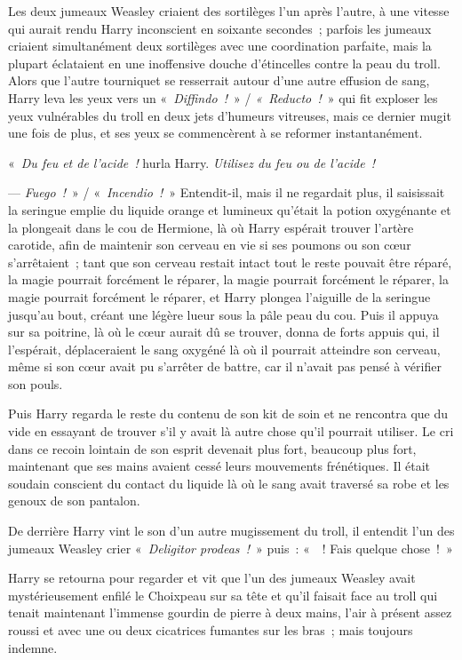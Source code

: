 Les deux jumeaux Weasley criaient des sortilèges l'un après l'autre, à une vitesse qui aurait rendu Harry inconscient en soixante secondes~; parfois les jumeaux criaient simultanément deux sortilèges avec une coordination parfaite, mais la plupart éclataient en une inoffensive douche d'étincelles contre la peau du troll.
Alors que l'autre tourniquet se resserrait autour d'une autre effusion de sang, Harry leva les yeux vers un «~\emph{Diffindo~!}~» / \emph{«~Reducto~!}~» qui fit exploser les yeux vulnérables du troll en deux jets d'humeurs vitreuses, mais ce dernier mugit une fois de plus, et ses yeux se commencèrent à se reformer instantanément.

«~\emph{Du feu et de l'acide~!} hurla Harry.
\emph{Utilisez du feu ou de l'acide~!}

--- \emph{Fuego~!}~» / «~\emph{Incendio~!}~» Entendit-il, mais il ne regardait plus, il saisissait la seringue emplie du liquide orange et lumineux qu'était la potion oxygénante et la plongeait dans le cou de Hermione, là où Harry espérait trouver l'artère carotide, afin de maintenir son cerveau en vie si ses poumons ou son cœur s'arrêtaient~; tant que son cerveau restait intact tout le reste pouvait être réparé, la magie pourrait forcément le réparer, la magie pourrait forcément le réparer, la magie pourrait forcément le réparer, et Harry plongea l'aiguille de la seringue jusqu'au bout, créant une légère lueur sous la pâle peau du cou.
Puis il appuya sur sa poitrine, là où le cœur aurait dû se trouver, donna de forts appuis qui, il l'espérait, déplaceraient le sang oxygéné là où il pourrait atteindre son cerveau, même si son cœur avait pu s'arrêter de battre, car il n'avait pas pensé à vérifier son pouls.

Puis Harry regarda le reste du contenu de son kit de soin et ne rencontra que du vide en essayant de trouver s'il y avait là autre chose qu'il pourrait utiliser.
Le cri dans ce recoin lointain de son esprit devenait plus fort, beaucoup plus fort, maintenant que ses mains avaient cessé leurs mouvements frénétiques.
Il était soudain conscient du contact du liquide là où le sang avait traversé sa robe et les genoux de son pantalon.

De derrière Harry vint le son d'un autre mugissement du troll, il entendit l'un des jumeaux Weasley crier «~\emph{Deligitor prodeas~!}~» puis~: «~~!
Fais quelque chose~!~»

Harry se retourna pour regarder et vit que l'un des jumeaux Weasley avait mystérieusement enfilé le Choixpeau sur sa tête et qu'il faisait face au troll qui tenait maintenant l'immense gourdin de pierre à deux mains, l'air à présent assez roussi et avec une ou deux cicatrices fumantes sur les bras~; mais toujours indemne.

